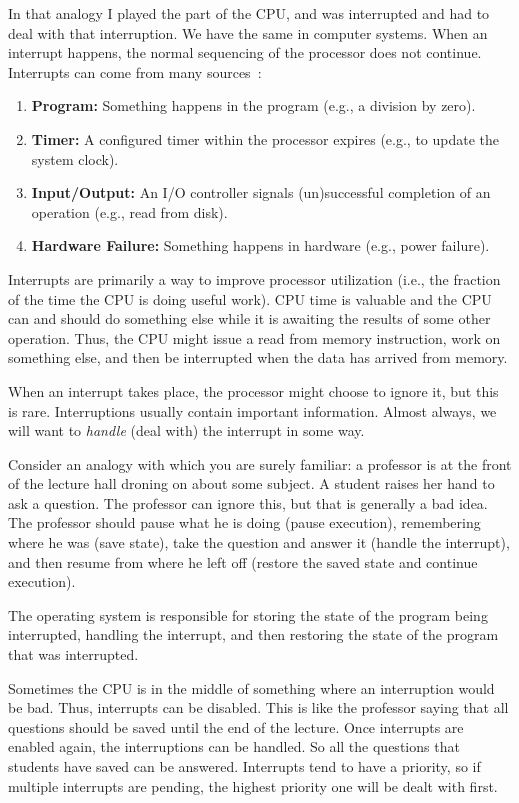 In that analogy I played the part of the CPU, and was interrupted and had to deal with that interruption. We have the same in computer systems. When an interrupt happens, the normal sequencing of the processor does not continue. Interrupts can come from many sources~\cite{osi}:

\begin{enumerate}
	\item \textbf{Program:} Something happens in the program (e.g., a division by zero).
	\item \textbf{Timer:} A configured timer within the processor expires (e.g., to update the system clock).
	\item \textbf{Input/Output:} An I/O controller signals (un)successful completion of an operation (e.g., read from disk).
	\item \textbf{Hardware Failure:} Something happens in hardware (e.g., power failure).
\end{enumerate}

Interrupts are primarily a way to improve processor utilization (i.e., the fraction of the time the CPU is doing useful work). CPU time is valuable and the CPU can and should do something else while it is awaiting the results of some other operation. Thus, the CPU might issue a read from memory instruction, work on something else, and then be interrupted when the data has arrived from memory.

When an interrupt takes place, the processor might choose to ignore it, but this is rare. Interruptions usually contain important information. Almost always, we will want to \textit{handle} (deal with) the interrupt in some way.

Consider an analogy with which you are surely familiar: a professor is at the front of the lecture hall droning on about some subject. A student raises her hand to ask a question. The professor can ignore this, but that is generally a bad idea. The professor should pause what he is doing (pause execution), remembering where he was (save state), take the question and answer it (handle the interrupt), and then resume from where he left off (restore the saved state and continue execution).

The operating system is responsible for storing the state of the program being interrupted, handling the interrupt, and then restoring the state of the program that was interrupted.

Sometimes the CPU is in the middle of something where an interruption would be bad. Thus, interrupts can be disabled. This is like the professor saying that all questions should be saved until the end of the lecture. Once interrupts are enabled again, the interruptions can be handled. So all the questions that students have saved can be answered. Interrupts tend to have a priority, so if multiple interrupts are pending, the highest priority one will be dealt with first.

